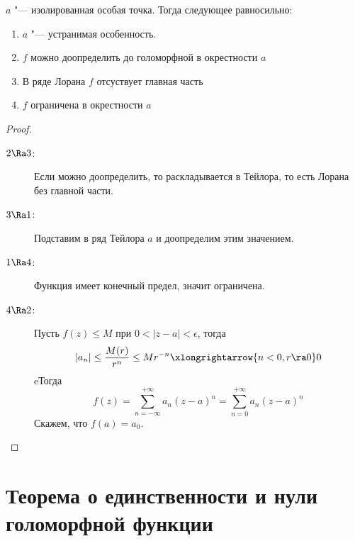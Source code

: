 \begin{theorem}
	$a$ "--- изолированная особая точка.
	Тогда следующее равносильно:
	\begin{enumerate}
		\item $a$ "--- устранимая особенность.
		\item $f$ можно доопределить до голоморфной в окрестности $a$
		\item В ряде Лорана $f$ отсуствует главная часть
		\item $f$ ограничена в окрестности $a$
	\end{enumerate}
\end{theorem}
\begin{proof}\begin{description}
\item[$2 \Ra 3$:]
	Если можно доопределить, то раскладывается в Тейлора, то есть Лорана без главной части.

\item[$3 \Ra 1$:]
	Подставим в ряд Тейлора $a$ и доопределим этим значением.

\item[$1 \Ra 4$:]
	Функция имеет конечный предел, значит ограничена.

\item[$4 \Ra 2$:]
	Пусть $f(z) \le M$ при $0 < |z - a| < \epsilon$, тогда
	\[ |a_n| \le \frac{M(r)}{r^n} \le M r^{-n} \xlongrightarrow{n < 0, r \ra 0} 0 \]
	eТогда
	\[ f(z) = \sum_{n=-\infty}^{+\infty} a_n (z-a)^n = \sum_{n=0}^{+\infty} a_n (z-a)^n \]
	Скажем, что $f(a) = a_0$.
\end{description}\end{proof}

\section{Теорема о единственности и нули голоморфной функции}

